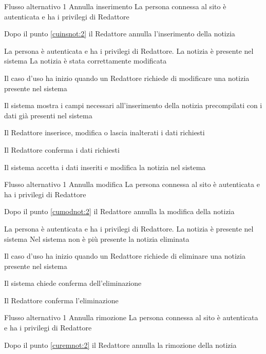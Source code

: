 %
{Flusso alternativo 1}%
{Annulla inserimento}%
{La persona connessa al sito è autenticata e ha i privilegi di Redattore}%
{\postNulle}%
{\begin{enumCU}
		\item Dopo il punto \ref{cuinsnot:2} il Redattore annulla l'inserimento della notizia
	\end{enumCU}}%

\tabcuvspace

{}
{La persona è autenticata e ha i privilegi di Redattore. La notizia è presente nel sistema}
{La notizia è stata correttamente modificata}
{\begin{enumCU}
	\item Il caso d'uso ha inizio quando un Redattore richiede di modificare una notizia presente nel sistema 
	\item Il sistema mostra i campi necessari all'inserimento della notizia precompilati con i dati già presenti nel sistema
	\item Il Redattore inserisce, modifica o lascia inalterati i dati richiesti \label{cumodnot:2}
	\item Il Redattore conferma i dati richiesti
	\item Il sistema accetta i dati inseriti e modifica la notizia nel sistema
\end{enumCU}}
%
{Flusso alternativo 1}%
{Annulla modifica}%
{La persona connessa al sito è autenticata e ha i privilegi di Redattore}%
{\postNulle}%
{\begin{enumCU}
		\item Dopo il punto \ref{cumodnot:2} il Redattore annulla la modifica della notizia
	\end{enumCU}}%

\tabcuvspace

{}
{La persona è autenticata e ha i privilegi di Redattore. La notizia è presente nel sistema}
{Nel sistema non è più presente la notizia eliminata}
{\begin{enumCU}
	\item Il caso d'uso ha inizio quando un Redattore richiede di eliminare una notizia presente nel sistema
	\item Il sistema chiede conferma dell'eliminazione \label{curemnot:2}
	\item Il Redattore conferma l'eliminazione
\end{enumCU}}
%
{Flusso alternativo 1}%
{Annulla rimozione}%
{La persona connessa al sito è autenticata e ha i privilegi di Redattore}%
{\postNulle}%
{\begin{enumCU}
		\item Dopo il punto \ref{curemnot:2} il Redattore annulla la rimozione della notizia
	\end{enumCU}}%

